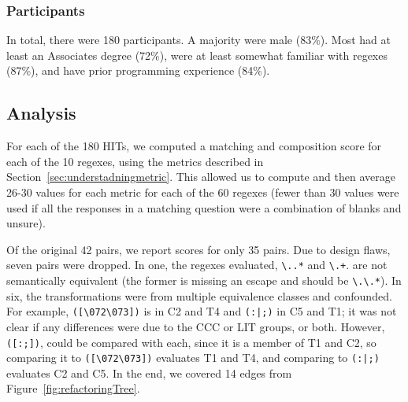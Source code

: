 \subsubsection{Participants}

In total, there were 180 participants.
A majority were male (83\%). %
Most had
at least an Associates degree (72\%), were at least somewhat familiar with regexes (87\%), and have prior programming experience (84\%). 




\subsection{Analysis}
For each of the 180 HITs, we computed a matching and composition score for each of the 10 regexes, using the metrics described in Section~\ref{sec:understadningmetric}. This allowed us to compute and then average 26-30 values for each metric  for each of the 60 regexes (fewer than 30 values were used if all the responses in a matching question were a combination of blanks and unsure). %


Of the original 42 pairs, we report scores for only 35 pairs. Due to design flaws, seven pairs were dropped. In one, the regexes evaluated, \verb!\..*! and \verb!\.+!. are not semantically equivalent (the former is missing an escape and should be \verb!\.\.*!). In  six, the  transformations were from multiple equivalence classes and confounded. For example,  \verb!([\072\073])! is in C2 and T4 and  \verb!(:|;)! in C5 and T1;  it was not clear if any differences were due to the CCC or LIT groups, or both. However, \verb!([:;])!, could be compared with each, since it is a member of T1 and C2, so comparing it to \verb!([\072\073])! evaluates T1 and T4, and comparing to \verb!(:|;)! evaluates  C2 and C5. In the end, we covered  14 edges from Figure~\ref{fig:refactoringTree}.

